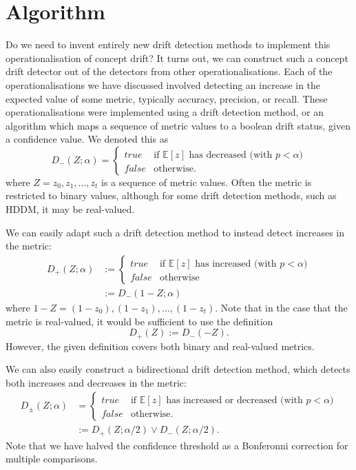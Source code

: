 
\section{Algorithm} \label{mdd:algorithm}

Do we need to invent entirely new drift detection methods to implement this operationalisation of concept drift? It turns out, we can construct such a concept drift detector out of the detectors from other operationalisations. Each of the operationalisations we have discussed involved detecting an increase in the expected value of some metric, typically accuracy, precision, or recall. These operationalisations were implemented using a drift detection method, or an algorithm which maps a sequence of metric values to a boolean drift status, given a confidence value. We denoted this as
\begin{equation}
  D_-(Z;\alpha) = \begin{cases}
  true & \text{if $\mathds{E}[z]$ has decreased (with $p<\alpha$)} \\
  false & \text{otherwise}.
  \end{cases}
\end{equation}
where $Z=z_0,z_1,\dots,z_t$ is a sequence of metric values. Often the metric is restricted to binary values, although for some drift detection methods, such as HDDM, it may be real-valued.

We can easily adapt such a drift detection method to instead detect increases in the metric:
\begin{align}
  D_+(Z;\alpha) &:= \begin{cases}
  true & \text{if $\mathds{E}[z]$ has increased (with $p<\alpha$)} \\
  false & \text{otherwise}
  \end{cases} \\
  &:= D_-(1-Z;\alpha)
\end{align}
where $1-Z=(1-z_0),(1-z_1),\dots,(1-z_t)$. Note that in the case that the metric is real-valued, it would be sufficient to use the definition
\begin{equation}
  D_+(Z) := D_-(-Z).
\end{equation}
However, the given definition covers both binary and real-valued metrics.

We can also easily construct a bidirectional drift detection method, which detects both increases and decreases in the metric:
\begin{align}
  D_\pm(Z;\alpha) &= \begin{cases}
  true & \text{if $\mathds{E}[z]$ has increased or decreased (with $p<\alpha$)} \\
  false & \text{otherwise}.
  \end{cases} \\
  &:= D_+(Z;\alpha/2) \vee D_-(Z;\alpha/2).
\end{align}
Note that we have halved the confidence threshold as a Bonferonni correction for multiple comparisons.

